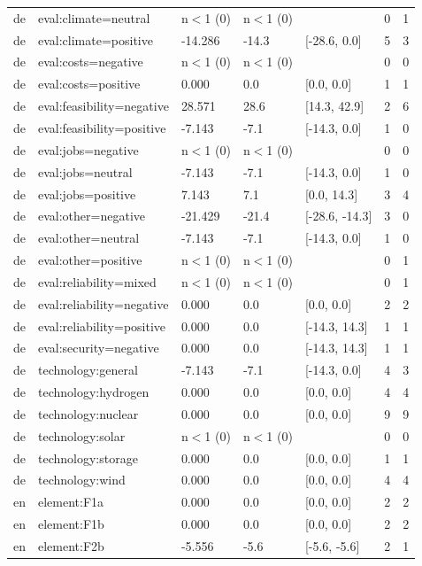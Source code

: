 \begin{table}[htbp]
\begin{tabular}{lllllll}
de & eval:climate=neutral & n$<$1 (0) & n$<$1 (0) &  & 0 & 1 \\
de & eval:climate=positive & -14.286 & -14.3 & [-28.6, 0.0] & 5 & 3 \\
de & eval:costs=negative & n$<$1 (0) & n$<$1 (0) &  & 0 & 0 \\
de & eval:costs=positive & 0.000 & 0.0 & [0.0, 0.0] & 1 & 1 \\
de & eval:feasibility=negative & 28.571 & 28.6 & [14.3, 42.9] & 2 & 6 \\
de & eval:feasibility=positive & -7.143 & -7.1 & [-14.3, 0.0] & 1 & 0 \\
de & eval:jobs=negative & n$<$1 (0) & n$<$1 (0) &  & 0 & 0 \\
de & eval:jobs=neutral & -7.143 & -7.1 & [-14.3, 0.0] & 1 & 0 \\
de & eval:jobs=positive & 7.143 & 7.1 & [0.0, 14.3] & 3 & 4 \\
de & eval:other=negative & -21.429 & -21.4 & [-28.6, -14.3] & 3 & 0 \\
de & eval:other=neutral & -7.143 & -7.1 & [-14.3, 0.0] & 1 & 0 \\
de & eval:other=positive & n$<$1 (0) & n$<$1 (0) &  & 0 & 1 \\
de & eval:reliability=mixed & n$<$1 (0) & n$<$1 (0) &  & 0 & 1 \\
de & eval:reliability=negative & 0.000 & 0.0 & [0.0, 0.0] & 2 & 2 \\
de & eval:reliability=positive & 0.000 & 0.0 & [-14.3, 14.3] & 1 & 1 \\
de & eval:security=negative & 0.000 & 0.0 & [-14.3, 14.3] & 1 & 1 \\
de & technology:general & -7.143 & -7.1 & [-14.3, 0.0] & 4 & 3 \\
de & technology:hydrogen & 0.000 & 0.0 & [0.0, 0.0] & 4 & 4 \\
de & technology:nuclear & 0.000 & 0.0 & [0.0, 0.0] & 9 & 9 \\
de & technology:solar & n$<$1 (0) & n$<$1 (0) &  & 0 & 0 \\
de & technology:storage & 0.000 & 0.0 & [0.0, 0.0] & 1 & 1 \\
de & technology:wind & 0.000 & 0.0 & [0.0, 0.0] & 4 & 4 \\
en & element:F1a & 0.000 & 0.0 & [0.0, 0.0] & 2 & 2 \\
en & element:F1b & 0.000 & 0.0 & [0.0, 0.0] & 2 & 2 \\
en & element:F2b & -5.556 & -5.6 & [-5.6, -5.6] & 2 & 1 \\

\end{tabular}
\end{table}
